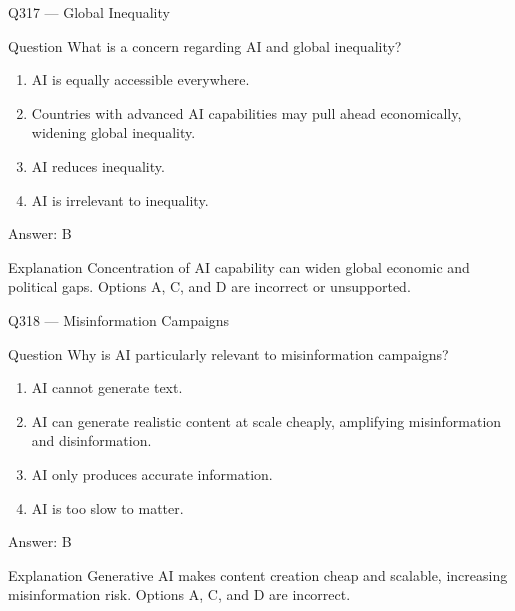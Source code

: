 \documentclass[aspectratio=169,8pt]{beamer}
\begin{document}
\begin{frame}{Q317 --- Global Inequality}
	\begin{block}{Question}
		What is a concern regarding AI and global inequality?
		\begin{enumerate}
			\item AI is equally accessible everywhere.
			\item Countries with advanced AI capabilities may pull ahead economically, widening global inequality.
			\item AI reduces inequality.
			\item AI is irrelevant to inequality.
	\end{enumerate}  \end{block}
	\begin{exampleblock}{Answer: B}\end{exampleblock}
	\begin{block}{Explanation}
		Concentration of AI capability can widen global economic and political gaps. Options A, C, and D are incorrect or unsupported.
	\end{block}
\end{frame}

\begin{frame}{Q318 --- Misinformation Campaigns}
	\begin{block}{Question}
		Why is AI particularly relevant to misinformation campaigns?
		\begin{enumerate}
			\item AI cannot generate text.
			\item AI can generate realistic content at scale cheaply, amplifying misinformation and disinformation.
			\item AI only produces accurate information.
			\item AI is too slow to matter.
	\end{enumerate}  \end{block}
	\begin{exampleblock}{Answer: B}\end{exampleblock}
	\begin{block}{Explanation}
		Generative AI makes content creation cheap and scalable, increasing misinformation risk. Options A, C, and D are incorrect.
	\end{block}
\end{frame}
\end{document}
